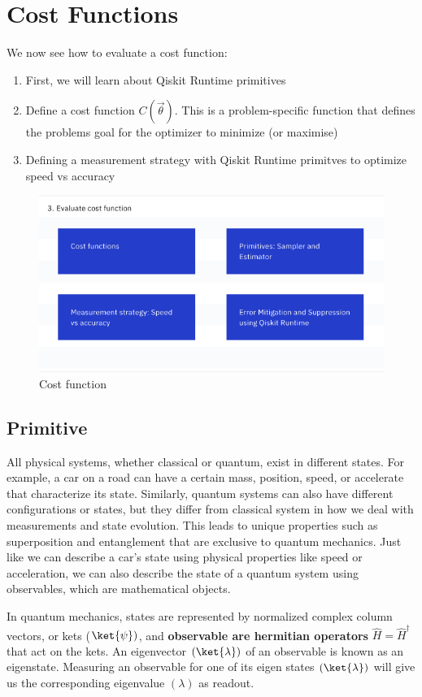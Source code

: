 \documentclass[12pt, oneside]{book}
\theoremstyle{definition}
\theoremstyle{definition}
\theoremstyle{remark}
\begin{document}
\section{Cost Functions}
We now see how to evaluate a cost function:
\begin{enumerate}
    \item First, we will learn about Qiskit Runtime primitives
    \item Define a cost function $C(\vec{\theta})$. This is a problem-specific function that defines the problems goal for the optimizer to minimize (or maximise)
    \item Defining a measurement strategy with Qiskit Runtime primitves to optimize speed vs accuracy
\end{enumerate}
\begin{figure}[H]
    \centering
    \includegraphics[width=0.75\linewidth]{../images/Costfunc.png}
    \caption{Cost function}
    \label{fig:cost_func}
\end{figure}
\subsection{Primitive}
All physical systems, whether classical or quantum, exist in different states. For example, a car on a road can have a certain mass, position, speed, or accelerate that characterize its state. Similarly, quantum systems can also have different configurations or states, but they differ from classical system in how we deal with measurements and state evolution. This leads to unique properties such as superposition and entanglement that are exclusive to quantum mechanics. Just like we can describe a car's state using physical properties like speed or acceleration, we can also describe the state of a quantum system using observables, which are mathematical objects.

In quantum mechanics, states are represented by normalized complex column vectors, or kets ($\ket{\psi})$, and \textbf{observable are hermitian operators} $\hat{H}=\hat{H}^{\dagger}$ that act on the kets. An eigenvector $(\ket{\lambda})$ of an observable is known as an eigenstate. Measuring an observable for one of its eigen states $(\ket{\lambda})$ will give us the corresponding eigenvalue $(\lambda)$ as readout.
\end{document}
